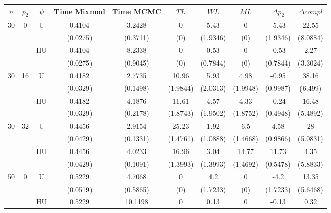 \documentclass[11pt,a4paper]{article}
\begin{document}
\begin{table}[h!]
\centering
\begin{tabular}{|c|c|c|c|c|c|c|c|c|c|}
\hline
$n$ & $p_2$ & $\psi$ &  Time Mixmod  & Time MCMC  & $TL$ & $WL$ & $ML$ & $\Delta p_2$ & $\Delta compl$ \\
\hline %
30 & 0 & U&0.4104 & 3.2428 & 0 & 5.43 & 0 & -5.43 & 22.55  \\
& & & (0.0275) & (0.3711) & (0) & (1.9346) & (0) & (1.9346) & (8.0884) \\
 &  &HU &0.4104 & 8.2338 & 0 & 0.53 & 0 & -0.53 & 2.27  \\
& & & (0.0275) & (0.9045) & (0) & (0.7844) & (0) & (0.7844) & (3.3024) \\
\hline %
30 & 16 & U&0.4182 & 2.7735 & 10.96 & 5.93 & 4.98 & -0.95 & 38.16  \\
& & & (0.0329) & (0.1498) & (1.9844) & (2.0313) & (1.9948) & (0.9987) & (6.499) \\
 &  &HU &0.4182 & 4.1876 & 11.61 & 4.57 & 4.33 & -0.24 & 16.48  \\
& & & (0.0329) & (0.2178) & (1.8743) & (1.9502) & (1.8752) & (0.4948) & (5.4892) \\
\hline %
30 & 32 & U & 0.4456 & 2.9154 & 25.23 & 1.92 & 6.5 & 4.58 & 28  \\
& & & (0.0429) & (0.1331) & (1.4761) & (1.0888) & (1.4668) & (0.9866) & (5.0831) \\
 &  & HU & 0.4456 & 4.0233 & 16.96 & 3.04 & 14.77 & 11.73 & 4.35  \\
& & & (0.0429) & (0.1091) & (1.3993) & (1.3993) & (1.4692) & (0.5478) & (5.8833) \\
\hline
\hline %
50 & 0 & U&0.5229 & 4.7068 & 0 & 4.2 & 0 & -4.2 & 13.35  \\
& & & (0.0519) & (0.5865) & (0) & (1.7233) & (0) & (1.7233) & (5.6468) \\
 &  & HU &0.5229 & 10.1198 & 0 & 0.13 & 0 & -0.13 & 0.32  \\

\end{tabular}
\end{table}
\end{document}
